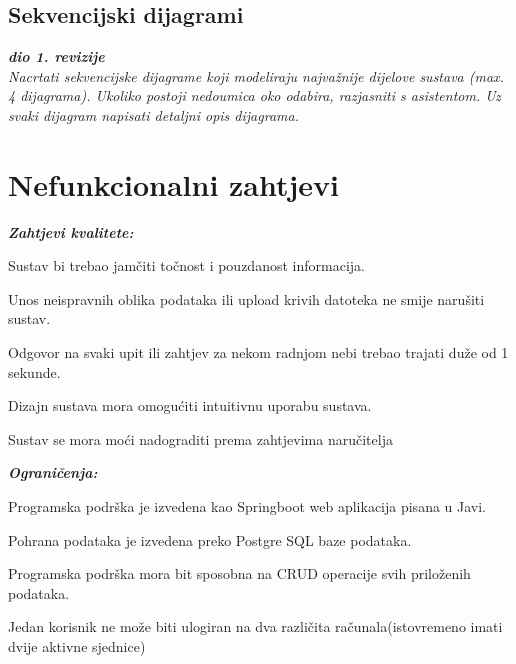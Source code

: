                 
                \eject
				
			\subsection{Sekvencijski dijagrami}
				
				\textbf{\textit{dio 1. revizije}}\\
				
				\textit{Nacrtati sekvencijske dijagrame koji modeliraju najvažnije dijelove sustava (max. 4 dijagrama). Ukoliko postoji nedoumica oko odabira, razjasniti s asistentom. Uz svaki dijagram napisati detaljni opis dijagrama.}
				\eject
				
	
		\section{Nefunkcionalni zahtjevi}
		
		    	\textbf{\textit{Zahtjevi kvalitete:}}\\
		 
		\begin{packed_item}
	
						\item Sustav bi trebao jamčiti točnost i pouzdanost informacija.
						\item  Unos neispravnih oblika podataka ili upload krivih datoteka ne smije narušiti sustav.
						\item Odgovor na svaki upit ili zahtjev za nekom radnjom nebi trebao trajati duže od 1 sekunde.
						\item  Dizajn sustava mora omogućiti intuitivnu uporabu sustava.
						\item Sustav se mora moći nadograditi prema zahtjevima naručitelja
						
					\end{packed_item}
				
			 
	    	\textbf{\textit{Ograničenja:}}\\
		 
			\begin{packed_item}
	
						\item Programska podrška je izvedena kao Springboot web aplikacija pisana u Javi.
						\item  Pohrana podataka je izvedena preko Postgre SQL baze podataka.
						\item Programska podrška mora bit sposobna na CRUD operacije svih priloženih podataka.
						\item  Jedan korisnik ne može biti ulogiran na dva različita računala(istovremeno imati dvije aktivne sjednice)
						
					\end{packed_item}
			 
			 
			 
	